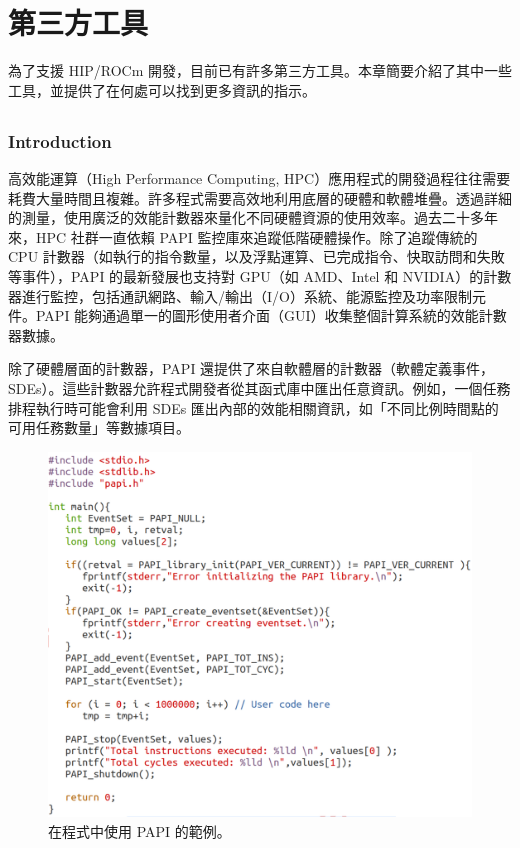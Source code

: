\chapter{第三方工具}
\label{chap:Third-Party Tools}

為了支援 HIP/ROCm 開發，目前已有許多第三方工具。本章簡要介紹了其中一些工具，並提供了在何處可以找到更多資訊的指示。

\section{}
\subsection{Introduction}

高效能運算（High Performance Computing, HPC）應用程式的開發過程往往需要耗費大量時間且複雜。許多程式需要高效地利用底層的硬體和軟體堆疊。透過詳細的測量，使用廣泛的效能計數器來量化不同硬體資源的使用效率。過去二十多年來，HPC 社群一直依賴 PAPI 監控庫來追蹤低階硬體操作。除了追蹤傳統的 CPU 計數器（如執行的指令數量，以及浮點運算、已完成指令、快取訪問和失敗等事件），PAPI 的最新發展也支持對 GPU（如 AMD、Intel 和 NVIDIA）的計數器進行監控，包括通訊網路、輸入/輸出（I/O）系統、能源監控及功率限制元件。PAPI 能夠通過單一的圖形使用者介面（GUI）收集整個計算系統的效能計數器數據。

除了硬體層面的計數器，PAPI 還提供了來自軟體層的計數器（軟體定義事件，SDEs）。這些計數器允許程式開發者從其函式庫中匯出任意資訊。例如，一個任務排程執行時可能會利用 SDEs 匯出內部的效能相關資訊，如「不同比例時間點的可用任務數量」等數據項目。


\begin{figure}
    \centering
    \includegraphics[width=0.9\linewidth]{FileAusiliari/Screenshots/Figure13-1.png}
    \caption{在程式中使用 PAPI 的範例。}
    \label{fig:PAPI}
\end{figure}

